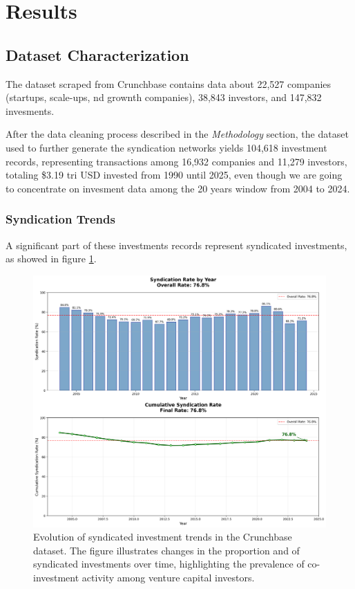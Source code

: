 \section{Results}

\subsection{Dataset Characterization}

The dataset scraped from Crunchbase contains data about 22,527 companies (startups, scale-ups, nd grownth companies), 38,843 investors, and 147,832 invesments.

After the data cleaning process described in the \textit{Methodology} section, the dataset used to further generate the syndication networks yields 104,618 investment records, representing transactions among 16,932 companies and 11,279 investors, totaling \$3.19 tri USD invested from 1990 until 2025, even though we are going to concentrate on invesment data among the 20 years window from 2004 to 2024.

\subsubsection{Syndication Trends}

A significant part of these investments records represent syndicated investments, as showed in figure \ref{fig:syndication_evolution}.

\begin{figure}[htbp]
\centering
\includegraphics[width=1\textwidth]{../figures/us/syndication_trends.png}
\caption{Evolution of syndicated investment trends in the Crunchbase dataset. The figure illustrates changes in the proportion and of syndicated investments over time, highlighting the prevalence of co-investment activity among venture capital investors.}
\label{fig:syndication_evolution}
\end{figure}

